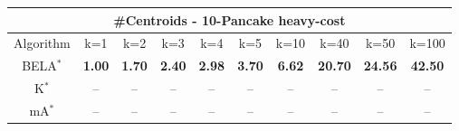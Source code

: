 \begin{tabular}{c|ccccccccc}\toprule
\multicolumn{10}{c}{#Centroids - 10-Pancake heavy-cost}\\ \midrule
Algorithm & k=1 & k=2 & k=3 & k=4 & k=5 & k=10 & k=40 & k=50 & k=100 \\ \midrule
BELA$^*$ & \textbf{1.00} & \textbf{1.70} & \textbf{2.40} & \textbf{2.98} & \textbf{3.70} & \textbf{6.62} & \textbf{20.70} & \textbf{24.56} & \textbf{42.50} \\
K$^*$ & -- & -- & -- & -- & -- & -- & -- & -- & -- \\
mA$^*$ & -- & -- & -- & -- & -- & -- & -- & -- & -- \\ \bottomrule 
\end{tabular}
